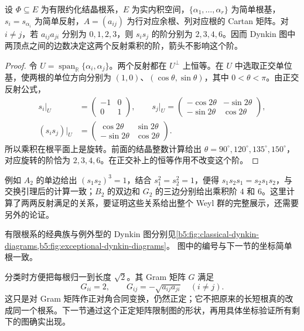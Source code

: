 \begin{proposition}\label{b5:prop:dynkin-reflection-order}
	设 \(\Phi\subseteq E\) 为有限约化结晶根系，\(E\) 为实内积空间，\(\{\alpha_1,\ldots,\alpha_r\}\) 为简单根基，\(s_i=s_{\alpha_i}\) 为简单反射，\(A=(a_{ij})\) 为行对应余根、列对应根的 Cartan 矩阵。对 \(i\ne j\)，若 \(a_{ij}a_{ji}\) 分别为 \(0,1,2,3\)，则 \(s_is_j\) 的阶分别为 \(2,3,4,6\)。因而 Dynkin 图中两顶点之间的边数决定这两个反射乘积的阶，箭头不影响这个阶。
\end{proposition}
\begin{proof}
	令 \(U=\operatorname{span}_{\mathbb R}\{\alpha_i,\alpha_j\}\)。两个反射都在 \(U^\perp\) 上恒等。在 \(U\) 中选取正交单位基，使两根的单位方向分别为 \((1,0)\)、\((\cos\theta,\sin\theta)\)，其中 \(0<\theta<\pi\)。由正交反射公式，
	\[
		\begin{aligned}
			s_i\big|_U&=\begin{pmatrix}-1&0\\0&1\end{pmatrix},\qquad
			s_j\big|_U=
			\begin{pmatrix}
				-\cos2\theta&-\sin2\theta\\
				-\sin2\theta&\cos2\theta
			\end{pmatrix},\\
			(s_is_j)\big|_U&=
			\begin{pmatrix}
				\cos2\theta&\sin2\theta\\
				-\sin2\theta&\cos2\theta
			\end{pmatrix}.
		\end{aligned}
	\]
	所以乘积在根平面上是旋转。前面的结晶整数计算给出 \(\theta=90^\circ,120^\circ,135^\circ,150^\circ\)，对应旋转的阶恰为 \(2,3,4,6\)。在正交补上的恒等作用不改变这个阶。
\end{proof}

例如 \(A_2\) 的单边给出 \((s_1s_2)^3=1\)，结合 \(s_1^2=s_2^2=1\)，便得 \(s_1s_2s_1=s_2s_1s_2\)，与交换引理后的计算一致；\(B_2\) 的双边和 \(G_2\) 的三边分别给出乘积阶 \(4\) 和 \(6\)。这里计算了两两反射满足的关系，要证明这些关系给出整个 Weyl 群的完整展示，还需要另外的论证。

\ProseParagraphBreak

有限根系的经典族与例外型的 Dynkin 图分别见\cref{b5:fig:classical-dynkin-diagrams,b5:fig:exceptional-dynkin-diagrams}。 图中的编号与下一节的坐标简单根一致。




分类时方便把每根归一到长度 \(\sqrt2\)。其 Gram 矩阵 \(G\) 满足
\[
	G_{ii}=2,\qquad G_{ij}=-\sqrt{a_{ij}a_{ji}}\quad(i\ne j).
\]
这只是对 Gram 矩阵作正对角合同变换，仍然正定；它不把原来的长短根真的改成同一个根系。下一节通过这个正定矩阵限制图的形状，再用具体坐标验证所有剩下的图确实出现。

